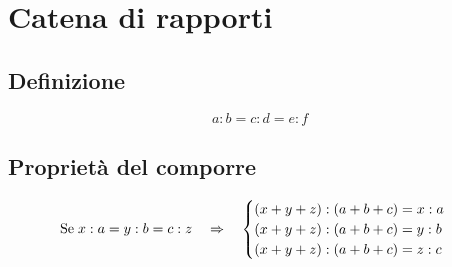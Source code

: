 \chapter{Catena di rapporti}
\section{Definizione}
\begin{equation*}
a:b=c:d=e:f
\end{equation*}
\section{Proprietà del comporre}
\begin{equation*}                       
\text{Se\;}x:a=y:b=c:z\quad\Rightarrow\quad \begin{cases}
(x+y+z):(a+b+c)=x:a\\
(x+y+z):(a+b+c)=y:b\\
(x+y+z):(a+b+c)=z:c
\end{cases}
\end{equation*}
